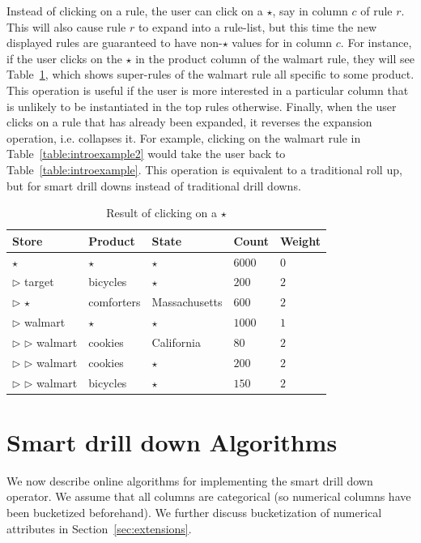 \documentclass[10pt,journal,compsoc]{IEEEtran}
\newcommand{\papertext}[1]{}
\newcommand{\techreporttext}[1]{#1}
\begin{document}
Instead of clicking on a rule, the user can click on a $\star$, say in column $c$ of rule $r$. This will also cause rule $r$ to expand into a rule-list, but this time the new displayed rules are guaranteed to have non-$\star$ values for in column $c$. \techreporttext{ For instance, if the user clicks on the $\star$ in the product column of the walmart rule, they will see Table~\ref{table:introexample3}, which shows super-rules of the walmart rule all specific to some product. This operation is useful if the user is more interested in a particular column that is unlikely to be instantiated in the top rules otherwise.} Finally, when the user clicks on a rule that has already been expanded, it reverses the expansion operation, i.e. collapses it. \techreporttext{ For example, clicking on the walmart rule in Table~\ref{table:introexample2} would take the user back to Table~\ref{table:introexample}. This operation is equivalent to a traditional
roll up, but for smart drill downs instead of traditional drill downs.}

\techreporttext{
\begin{table}
\scriptsize
\centering
\begin{tabular}{| l | l | l | l | l |}
\hline Store & Product & State & Count & Weight \\
\hline
$\star$ & $\star$ & $\star$ & $6000$ & $0$ \\ \cline{1-5}
$\triangleright$ target & bicycles & $\star$ & $200$ & $2$ \\ \cline{1-5}
$\triangleright$ $\star$ & comforters & Massachusetts & $600$ & $2$ \\ \cline{1-5}
$\triangleright$ walmart & $\star$ & $\star$ & $1000$ & $1$ \\ \cline{2-5}
$\triangleright$ $\triangleright$ walmart & cookies & California & $80$ & $2$ \\ \cline{2-5}
$\triangleright$ $\triangleright$ walmart & cookies & $\star$ & $200$ & $2$ \\ \cline{2-5}
$\triangleright$ $\triangleright$ walmart & bicycles & $\star$ & $150$ & $2$ \\  \hline
\end{tabular}
\caption{Result of clicking on a $\star$ \label{table:introexample3}}
\end{table}
}



\section{Smart drill down Algorithms} \label{sec:algorithms}
We now describe online algorithms for implementing
the smart drill down operator. We assume that all columns are categorical (so numerical columns have been bucketized beforehand). \papertext{We further discuss bucketization of numerical attributes in the Extensions section in the technical report~\cite{tr}}\techreporttext{We further discuss bucketization of numerical attributes in Section~\ref{sec:extensions}}.
\end{document}
